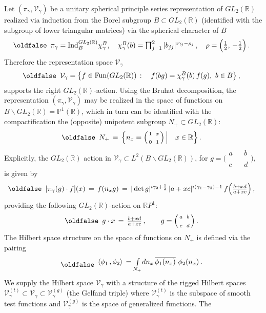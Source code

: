 \documentclass[12pt]{article}
\def\IP{\mathbb{P}}
\def\IR{\mathbb{R}}
\def\CV {\mathcal{V}}
\def\g {{\gamma}}
\def\Fun{{\rm Fun}}
\def\c{\cdot}
\def\ov {{\overline}}
\def\<{\langle}
\def\>{\rangle}
\def\ov{\overline}
\def\be{\begin{eqnarray}\new\begin{array}{cc}}
\def\ee{\end{array}\end{eqnarray}}
\newcounter{pac}[section]
\begin{document}
 Let $(\pi_\gamma,\CV_\gamma)$ be a unitary spherical principle
series
 representation  of $GL_2(\IR)$
realized via induction from the Borel subgroup $B\subset GL_2(\IR)$
(identified with the subgroup of  lower triangular matrices) via the
spherical character of $B$
 \be
  \pi_{\g}={\rm Ind}_B^{GL_2(\IR)}\chi^B_\gamma,\quad
  \chi^B_\gamma(b)=\prod_{j=1}^2 |b_{jj}|^{\imath \g_j-\rho_j}\,,\quad
  \rho=\Big(\frac{1}{2},\,-\frac{1}{2}\Big)\,.
 \ee
Therefore the representation space $\CV_\gamma$
 \be
  \CV_{\g}=\bigl\{f\in\Fun(GL_2(\IR))\,:\quad
  f(bg)=\chi^B_{\g}(b)\,f(g),\,\,b\in B\bigr\}\,,
 \ee
supports the right $GL_2(\IR)$-action. Using the Bruhat decomposition,
the representation $(\pi_\gamma,\CV_\gamma)$ may be realized in the
space of functions on $B\backslash GL_2(\IR)=\IP^1(\IR)$, which in
turn can be identified with the compactification the (opposite)
unipotent subgroup $N_+\subset GL_2(\IR)$:
 \be
  N_+\,=\,\Big\{n_x=\Big(
  \begin{smallmatrix} 1&&x\\&&\\0 &&1\end{smallmatrix}\Big)\,\Big|
                                                 \quad x\in\IR\Big\}\,.
 \ee
Explicitly, the $GL_2(\IR)$ action in $\CV_\gamma\subset
L^2(B\backslash GL_2(\IR))$, for
$g=\Big(\begin{smallmatrix}a&&b\\&&\\c&&d\end{smallmatrix}\Big)$, is
given by
 \be\label{TrRools}
  [\pi_\gamma(g)\cdot f](x)\,=\,f(n_xg)\,
 =\,|\det g|^{\imath\gamma_2+\frac{1}{2}}\,|a+xc|^{\imath (\gamma_1-\gamma_2)-1}\,
  f\Big(\frac{b+xd}{a+xc}\Big)\,,
 \ee
providing the following $GL_2(\IR)$-action on $\IR P^1$:
 \be\label{RLaction}
  g\cdot x\,=\,\frac{b+xd}{a+xc}\,,\qquad
  g=\Big(\begin{smallmatrix}a&&b\\&&\\c&&d\end{smallmatrix}\Big)\,.
  \ee
  The Hilbert space structure on the space of functions on $N_+$
is defined via  the pairing
 \be\label{PAIR}
  \<\phi_1\,,\phi_2\>\,=\int\limits_{N_+}\!dn_x\,\ov{\phi_1(n_x)}\,\,\phi_2(n_x)\,.
 \ee
We  supply the  Hilbert space  $\CV_{\gamma}$ with a structure of
the rigged Hilbert spaces $\CV_{\gamma}^{(t)}\subset
\CV_{\gamma}\subset \CV_{\gamma}^{(g)}$ (the Gelfand triple) where
$\CV_{\gamma}^{(t)}$ is the subspace of smooth test functions and
$\CV_{\gamma}^{(g)}$ is the  space of generalized functions. The
\end{document}
